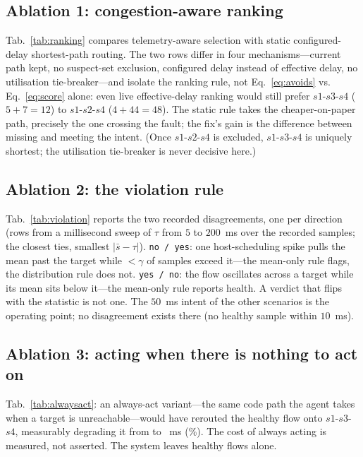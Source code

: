 \documentclass[conference]{IEEEtran}
\begin{document}
\subsection{Ablation 1: congestion-aware ranking}

Tab.~\ref{tab:ranking} compares telemetry-aware selection with static
configured-delay shortest-path routing. The two rows differ in four
mechanisms---current path kept, no suspect-set exclusion, configured delay
instead of effective delay, no utilisation tie-breaker---and isolate the
ranking rule, not Eq.~\eqref{eq:avoids} vs. Eq.~\eqref{eq:score} alone:
even live effective-delay ranking would still prefer $s1$-$s3$-$s4$ ($5+7=12$)
to $s1$-$s2$-$s4$ ($4+44=48$). The static rule takes the cheaper-on-paper
path, precisely the one crossing the fault; the fix's gain is the
difference between missing and meeting the intent. (Once $s1$-$s2$-$s4$ is
excluded, $s1$-$s3$-$s4$ is uniquely shortest; the utilisation tie-breaker is
never decisive here.)

\subsection{Ablation 2: the violation rule}

Tab.~\ref{tab:violation} reports the two recorded disagreements, one per
direction (rows from a millisecond sweep of $\tau$ from $5$ to $200$~ms
over the recorded samples; the closest ties, smallest
$|\bar{s}-\tau|$). \texttt{no / yes}: one host-scheduling spike pulls the
mean past the target while $<\gamma$ of samples exceed it---the mean-only
rule flags, the distribution rule does not. \texttt{yes / no}: the flow
oscillates across a target while its mean sits below it---the mean-only
rule reports health. A verdict that flips with the statistic is not one.
The $50$~ms intent of the other scenarios is the operating point; no
disagreement exists there (no healthy sample within $10$~ms).

\subsection{Ablation 3: acting when there is nothing to act on}

Tab.~\ref{tab:alwaysact}: an always-act variant---the same code path the
agent takes when a target is unreachable---would have rerouted the healthy
flow onto $s1$-$s3$-$s4$, measurably degrading it from
\AlwaysActBase{} to \AlwaysActLatency{}~ms (\AlwaysActPct\%). The cost
of always acting is measured, not asserted. The system leaves healthy
flows alone.
\end{document}
